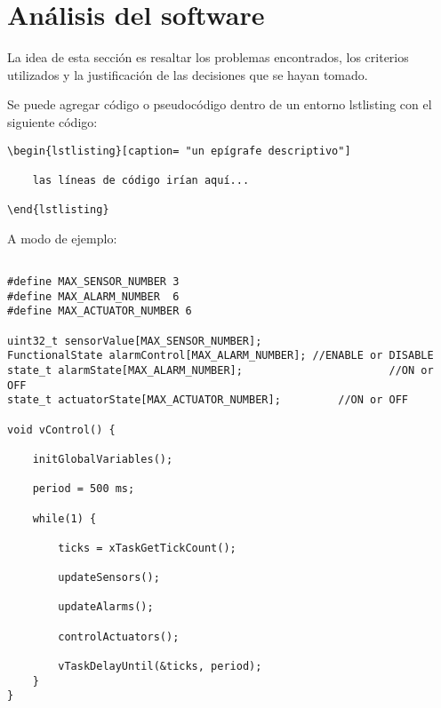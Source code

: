 \section{Análisis del software}
 
La idea de esta sección es resaltar los problemas encontrados, los criterios utilizados y la justificación de las decisiones que se hayan tomado.

Se puede agregar código o pseudocódigo dentro de un entorno lstlisting con el siguiente código:

\begin{verbatim}
\begin{lstlisting}[caption= "un epígrafe descriptivo"]

	las líneas de código irían aquí...
	
\end{lstlisting}
\end{verbatim}

A modo de ejemplo:

\begin{lstlisting}[caption=Pseudocódigo del lazo principal de control.]  % Start your code-block

#define MAX_SENSOR_NUMBER 3
#define MAX_ALARM_NUMBER  6
#define MAX_ACTUATOR_NUMBER 6

uint32_t sensorValue[MAX_SENSOR_NUMBER];		
FunctionalState alarmControl[MAX_ALARM_NUMBER];	//ENABLE or DISABLE
state_t alarmState[MAX_ALARM_NUMBER];						//ON or OFF
state_t actuatorState[MAX_ACTUATOR_NUMBER];			//ON or OFF

void vControl() {

	initGlobalVariables();
	
	period = 500 ms;
		
	while(1) {

		ticks = xTaskGetTickCount();
		
		updateSensors();
		
		updateAlarms();
		
		controlActuators();
		
		vTaskDelayUntil(&ticks, period);
	}
}
\end{lstlisting}



